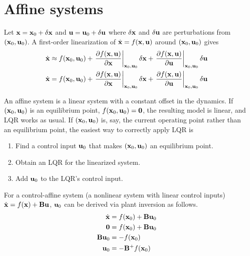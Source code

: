 \section{Affine systems}

Let $\mathbf{x} = \mathbf{x}_0 + \delta\mathbf{x}$ and
$\mathbf{u} = \mathbf{u}_0 + \delta\mathbf{u}$ where $\delta\mathbf{x}$ and $\delta\mathbf{u}$
are perturbations from $(\mathbf{x}_0, \mathbf{u}_0)$. A first-order linearization of
$\dot{\mathbf{x}} = f(\mathbf{x}, \mathbf{u})$ around $(\mathbf{x}_0, \mathbf{u}_0)$ gives
\begin{align*}
  \dot{\mathbf{x}} &\approx f(\mathbf{x}_0, \mathbf{u}_0) +
    \left.\frac{\partial f(\mathbf{x}, \mathbf{u})}{\partial \mathbf{x}}
    \right|_{\mathbf{x}_0, \mathbf{u}_0}\delta\mathbf{x} +
    \left.\frac{\partial f(\mathbf{x}, \mathbf{u})}{\partial \mathbf{u}}
    \right|_{\mathbf{x}_0, \mathbf{u}_0}\delta\mathbf{u} \\
  \dot{\mathbf{x}} &= f(\mathbf{x}_0, \mathbf{u}_0) +
    \left.\frac{\partial f(\mathbf{x}, \mathbf{u})}{\partial \mathbf{x}}
    \right|_{\mathbf{x}_0, \mathbf{u}_0}\delta\mathbf{x} +
    \left.\frac{\partial f(\mathbf{x}, \mathbf{u})}{\partial \mathbf{u}}
    \right|_{\mathbf{x}_0, \mathbf{u}_0}\delta\mathbf{u} \\
\end{align*}

An affine system is a linear system with a constant offset in the dynamics. If
$(\mathbf{x}_0, \mathbf{u}_0)$ is an equilibrium point,
$f(\mathbf{x}_0, \mathbf{u}_0) = \mathbf{0}$, the resulting \gls{model} is linear, and
LQR works as usual. If $(\mathbf{x}_0, \mathbf{u}_0)$ is, say, the current operating
point rather than an equilibrium point, the easiest way to correctly apply LQR
is
\begin{enumerate}
  \item Find a control input $\mathbf{u}_0$ that makes $(\mathbf{x}_0, \mathbf{u}_0)$ an
    equilibrium point.
  \item Obtain an LQR for the linearized system.
  \item Add $\mathbf{u}_0$ to the LQR's control input.
\end{enumerate}

For a control-affine \gls{system} (a nonlinear \gls{system} with linear control
inputs) $\dot{\mathbf{x}} = f(\mathbf{x}) + \mathbf{B}\mathbf{u}$, $\mathbf{u}_0$ can be
derived via plant inversion as follows.
\begin{align}
  \dot{\mathbf{x}} &= f(\mathbf{x}_0) + \mathbf{B}\mathbf{u}_0 \nonumber \\
  \mathbf{0} &= f(\mathbf{x}_0) + \mathbf{B}\mathbf{u}_0 \nonumber \\
  \mathbf{B}\mathbf{u}_0 &= -f(\mathbf{x}_0) \nonumber \\
  \mathbf{u}_0 &= -\mathbf{B}^+ f(\mathbf{x}_0)
\end{align}

